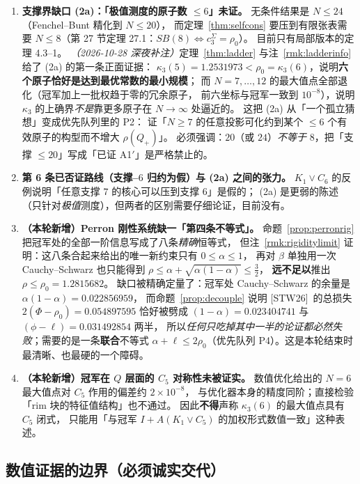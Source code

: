 \documentclass[UTF8,11pt]{ctexart}
\theoremstyle{definition}
\newcommand{\STW}{\textup{[STW26]}}
\begin{document}
\begin{enumerate}[leftmargin=1.8em,itemsep=4pt]
这正是 \STW\ 的 $\eta_{\mathrm{mix}}$ 表达式，只是多了权 $p$ 与自洽性两道约束（注~\ref{rmk:etamix}）。
\item \textbf{支撑界缺口 (2a)：「极值测度的原子数 $\le6$」未证。}
无条件结果是 $N\le24$（Fenchel--Bunt 精化到 $N\le20$），
而定理~\ref{thm:selfcons} 要压到有限张表需要 $N\le8$（第 27 节定理 27.1：$SB(8)\Leftrightarrow c_3^{\Sigma}=\rho_0$）。
目前只有局部版本的定理 4.3--1。
\emph{（2026-10-28 深夜补注）}定理~\ref{thm:ladder} 与注~\ref{rmk:ladderinfo} 给了 (2a) 的第一条正面证据：
$\kappa_3(5)=1.2531973<\rho_0=\kappa_3(6)$，说明\textbf{六个原子恰好是达到最优常数的最小规模}；
而 $N=7,\dots,12$ 的最大值点全部退化（冠军加上一批权趋于零的冗余原子，
前六坐标与冠军一致到 $10^{-8}$），说明 $\kappa_3$ 的上确界\emph{不是}靠更多原子在 $N\to\infty$ 处逼近的。
这把 (2a) 从「一个孤立猜想」变成优先队列里的 P2：
证「$N\ge7$ 的任意投影可化约到某个 $\le6$ 个有效原子的构型而不增大 $\rho(Q_+)$」。
必须强调：$20$（或 $24$）\emph{不等于} $8$，把「支撑 $\le20$」写成「已证 A1$'$」是严格禁止的。
\item \textbf{第 6 条已否证路线（支撑--$6$ 归约为假）与 (2a) 之间的张力。}
$K_1\vee C_6$ 的反例说明「任意支撑 $7$ 的核心可以压到支撑 $6$」是假的；
(2a) 是更弱的陈述（只针对\emph{极值}测度），但两者的区别需要仔细论证，目前没有。
\item \textbf{（本轮新增）Perron 刚性系统缺一「第四条不等式」。}
命题~\ref{prop:perronrig} 把冠军处的全部一阶信息写成了八条\emph{精确}恒等式，
但注~\ref{rmk:rigiditylimit} 证明：这八条合起来给出的唯一新约束只有 $0\le\alpha\le1$，
再对 $\beta$ 单独用一次 Cauchy--Schwarz 也只能得到 $\rho\le\alpha+\sqrt{\alpha(1-\alpha)}\le\frac32$，
\textbf{远不足以}推出 $\rho\le\rho_0=1.2815682$。
缺口被精确定量了：冠军处 Cauchy--Schwarz 的余量是 $\alpha(1-\alpha)=0.022856959$，
而命题~\ref{prop:decouple} 说明 \STW\ 的总损失 $2(\Phi-\rho_0)=0.054897595$
恰好被劈成 $(1-\alpha)=0.023404741$ 与 $(\phi-\ell)=0.031492854$ 两半，
所以\emph{任何只吃掉其中一半的论证都必然失败}；需要的是一条\textbf{联合}不等式
$\alpha+\ell\le2\rho_0$（优先队列 P4）。这是本轮结束时最清晰、也最硬的一个障碍。
\item \textbf{（本轮新增）冠军在 $Q$ 层面的 $C_5$ 对称性未被证实。}
数值优化给出的 $N=6$ 最大值点对 $C_5$ 作用的偏差约 $2\times10^{-8}$，
与优化器本身的精度同阶；直接检验「rim 块的特征值结构」也不通过。
因此\textbf{不得}声称 $\kappa_3(6)$ 的最大值点具有 $C_5$ 闭式，
只能用「与冠军 $I+A(K_1\vee C_5)$ 的加权形式数值一致」这种表述。
\end{enumerate}

\subsection{数值证据的边界（必须诚实交代）}
\end{document}
